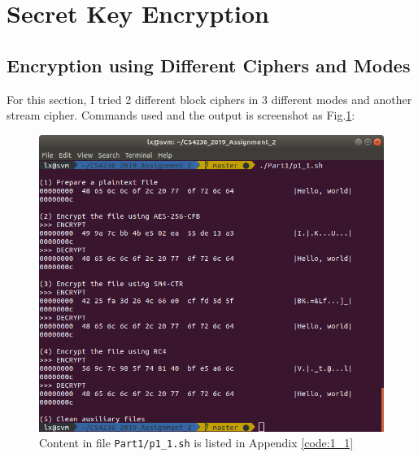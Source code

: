 \section{Secret Key Encryption}

\subsection{Encryption using Different Ciphers and Modes}

For this section, I tried 2 different block ciphers in 3 different modes and another stream cipher.
Commands used and the output is screenshot as Fig.\ref{fig:p1_1}:

\begin{figure}[hb]
\centering
\includegraphics[width=\columnwidth]{pictures/p1_1.png}
\caption{
    Content in file \texttt{Part1/p1\_1.sh} is listed in Appendix \ref{code:1_1}
}
\label{fig:p1_1}
\end{figure}

